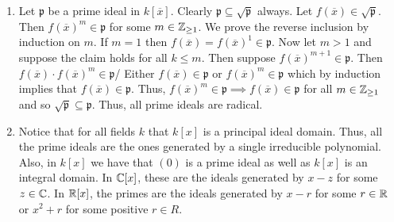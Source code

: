 \documentclass[letterpaper, 11pt, oneside]{book}
\begin{document}
\begin{sol}\label{ex:UAG_1.1.8}
  \begin{enumerate}
    \item Let $\mathfrak{p}$ be a prime ideal in $k[\overline{x}]$.
          Clearly $\mathfrak{p} \subseteq \sqrt{\mathfrak{p}}$ always.
          Let $f(\overline{x}) \in \sqrt{\mathfrak{p}}$.
          Then $f(\overline{x})^{m} \in \mathfrak{p}$ for some $m \in \mathbb{Z}_{\geq 1}$.
          We prove the reverse inclusion by induction on $m$.
          If $m = 1$ then $f(\overline{x}) =f(\overline{x})^{1} \in \mathfrak{p}$.
          Now let $m > 1$ and suppose the claim holds for all $k \leq m$.
          Then suppose $f(\overline{x})^{m + 1} \in \mathfrak{p}$.
          Then $f(\overline{x}) \cdot f(\overline{x})^{m} \in \mathfrak{p}$/
          Either $f(\overline{x}) \in \mathfrak{p}$ or $f(\overline{x})^{m} \in \mathfrak{p}$ which by induction implies that $f(\overline{x}) \in \mathfrak{p}$.
          Thus, $f(\overline{x})^{m} \in \mathfrak{p} \implies f(\overline{x}) \in \mathfrak{p}$ for all $m \in \mathbb{Z}_{\geq 1}$ and so $\sqrt{\mathfrak{p}} \subseteq \mathfrak{p}$.
          Thus, all prime ideals are radical.
    \item Notice that for all fields $k$ that $k[x]$ is a principal ideal domain.
          Thus, all the prime ideals are the ones generated by a single irreducible polynomial.
          Also, in $k[x]$ we have that $(0)$ is a prime ideal as well as $k[x]$ is an integral domain.
          In $\mathbb{C}[x]$, these are the ideals generated by $x - z$ for some $z \in \mathbb{C}$.
          In $\mathbb{R}[x]$, the primes are the ideals generated by $x - r$ for some $r \in \mathbb{R}$ or $x^{2} + r$ for some positive $r \in R$.
  \end{enumerate}
\end{sol}
\end{document}
